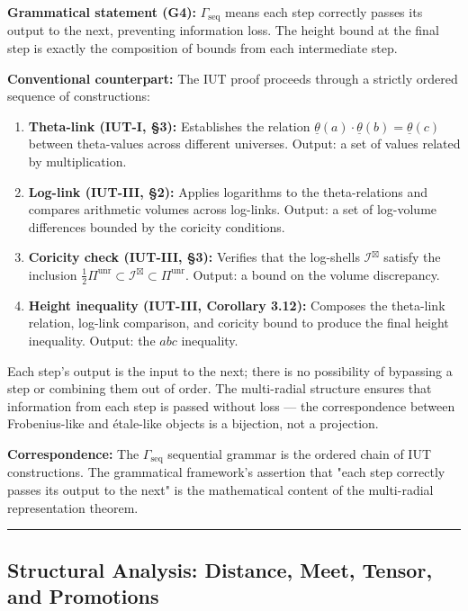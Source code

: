 \documentclass[12pt,a4paper]{article}
\newcommand{\pilcrow}{\S}
\begin{document}
\textbf{Grammatical statement (G4):} $\Gamma_\text{seq}$ means each step correctly passes its output to the next, preventing information loss. The height bound at the final step is exactly the composition of bounds from each intermediate step.

\textbf{Conventional counterpart:} The IUT proof proceeds through a strictly ordered sequence of constructions:

\begin{enumerate}
    \item \textbf{Theta-link (IUT-I, \pilcrow{}3):} Establishes the relation $\underline{\theta}(a) \cdot \underline{\theta}(b) = \underline{\theta}(c)$ between theta-values across different universes. Output: a set of values related by multiplication.
    \item \textbf{Log-link (IUT-III, \pilcrow{}2):} Applies logarithms to the theta-relations and compares arithmetic volumes across log-links. Output: a set of log-volume differences bounded by the coricity conditions.
    \item \textbf{Coricity check (IUT-III, \pilcrow{}3):} Verifies that the log-shells $\mathcal{I}^\boxtimes$ satisfy the inclusion $\frac{1}{2} \Pi^{\text{unr}} \subset \mathcal{I}^\boxtimes \subset \Pi^{\text{unr}}$. Output: a bound on the volume discrepancy.
    \item \textbf{Height inequality (IUT-III, Corollary 3.12):} Composes the theta-link relation, log-link comparison, and coricity bound to produce the final height inequality. Output: the $abc$ inequality.
\end{enumerate}

Each step's output is the input to the next; there is no possibility of bypassing a step or combining them out of order. The multi-radial structure ensures that information from each step is passed without loss --- the correspondence between Frobenius-like and étale-like objects is a bijection, not a projection.

\textbf{Correspondence:} The $\Gamma_\text{seq}$ sequential grammar is the ordered chain of IUT constructions. The grammatical framework's assertion that "each step correctly passes its output to the next" is the mathematical content of the multi-radial representation theorem.

\begin{center}
\rule{0.5\textwidth}{0.4pt}
\end{center}

\subsection{Structural Analysis: Distance, Meet, Tensor, and Promotions}
\end{document}
